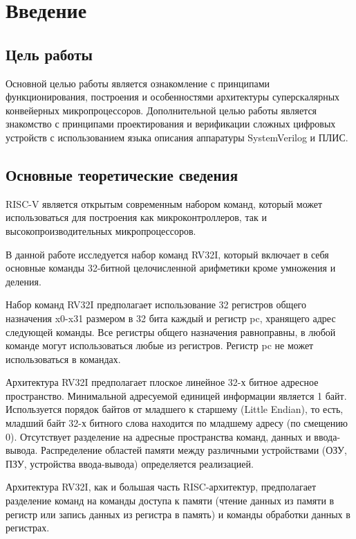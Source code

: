\section{Введение}

\subsection{Цель работы}

Основной целью работы является ознакомление с принципами функционирования, построения и особенностями архитектуры суперскалярных конвейерных микропроцессоров.
Дополнительной целью работы является знакомство с принципами проектирования и верификации сложных цифровых устройств с использованием языка описания аппаратуры SystemVerilog и ПЛИС.

\subsection{Основные теоретические сведения}

RISC-V является открытым современным набором команд, который может использоваться для построения как микроконтроллеров, так и высокопроизводительных микропроцессоров.

В данной работе исследуется набор команд RV32I, который включает в себя основные команды 32-битной целочисленной арифметики кроме умножения и деления. 

Набор команд RV32I предполагает использование 32 регистров общего назначения x0-x31 размером в 32 бита каждый и регистр pc, хранящего адрес следующей команды. 
Все регистры общего назначения равноправны, в любой команде могут использоваться любые из регистров. Регистр pc не может использоваться в командах.

Архитектура RV32I предполагает плоское линейное 32-х битное адресное пространство.
Минимальной адресуемой единицей информации является 1 байт.
Используется порядок байтов от младшего к старшему (Little Endian), то есть, младший байт 32-х битного слова находится по младшему адресу (по смещению 0).
Отсутствует разделение на адресные пространства команд, данных и ввода-вывода.
Распределение областей памяти между различными устройствами (ОЗУ, ПЗУ, устройства ввода-вывода) определяется реализацией.

Архитектура RV32I, как и большая часть RISC-архитектур, предполагает разделение команд на команды доступа к памяти (чтение данных из памяти в регистр или  запись данных из регистра в память) и команды обработки данных в регистрах.